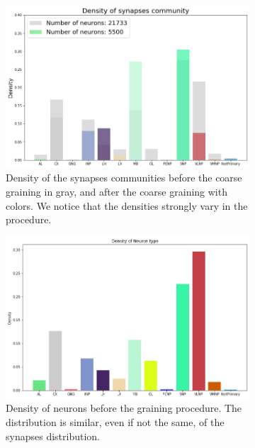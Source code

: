 \begin{figure}
    \centering
    \begin{subfigure}[t]{0.49\textwidth}
		\centering
		\includegraphics[width=\textwidth]{Images/Communities/Communities_after_graining.png}
		\caption{Density of the synapses communities before the coarse graining in gray, and 
		after the coarse graining with colors. We notice that the densities strongly vary in the 
		procedure.}
	\end{subfigure}
	\hfill
	\begin{subfigure}[t]{0.49\textwidth}
		\centering
		\includegraphics[width=\textwidth]{Images/Communities/Density_neurons_21733.png}
		\caption{Density of neurons before the graining procedure. The distribution is similar,
		even if not the same, of the synapses distribution.}
	\end{subfigure}
	\caption{}
	\label{fig:com_evol}
\end{figure}

